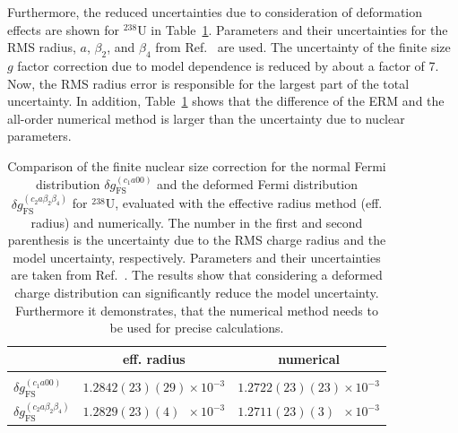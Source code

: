 Furthermore, the reduced uncertainties due to consideration of deformation effects are shown for $^{238}$U in Table~\ref{tab:uranium}. Parameters and their uncertainties for the RMS radius, $a$, $\beta_2$, and $\beta_4$ from Ref.~\cite{kozhedub2008} are used. The uncertainty of the finite size $g$ factor correction due to model dependence is reduced by about a factor of 7. Now, the RMS radius error is responsible for the largest part of the total uncertainty.  
In addition, Table~\ref{tab:uranium} shows that the difference of the ERM and the all-order numerical method is larger than the uncertainty due to nuclear parameters.
%
\begin{table}[t]
\caption{\label{tab:uranium}%
Comparison of the finite nuclear size correction for the normal Fermi distribution $\delta g_{\text{FS}}^{(c_1a00)}$ and the deformed Fermi distribution $\delta g^{(c_2 a \beta_2\beta_4)}_{\text{FS}}$ for $^{238}$U, evaluated with the effective radius method (eff. radius) and numerically. The number in the first and second parenthesis is the uncertainty due to the RMS charge radius and the model uncertainty, respectively. Parameters and their uncertainties are taken from Ref.~\cite{jacek2012}. The results show that considering a deformed charge distribution can significantly reduce the model uncertainty. Furthermore it demonstrates, that the numerical method needs to be used for precise calculations.
}
\centering
\begin{tabular}{l|cc}
&eff. radius&numerical\\\hline\\
$\delta g_{\text{FS}}^{(c_1a00)}$&$1.2842(23)(29)\times 10^{-3}$&$1.2722(23)(23)\times 10^{-3}$\\[0.4cm]
$\delta g^{(c_2a\beta_2\beta_4)}_{\text{FS}}$&$1.2829(23)(4)\phantom{0}\times 10^{-3}$&$1.2711(23)(3)\phantom{0}\times 10^{-3}$
\end{tabular}
\end{table}
%
